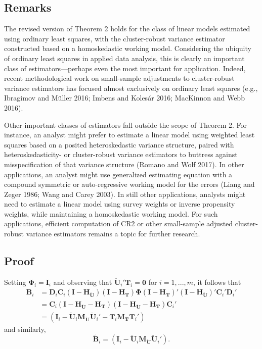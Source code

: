 \documentclass[12pt]{article}
\begin{document}
\hypertarget{remarks}{%
\subsection{Remarks}\label{remarks}}

The revised version of Theorem 2 holds for the class of linear models
estimated using ordinary least squares, with the cluster-robust variance
estimator constructed based on a homoskedastic working model.
Considering the ubiquity of ordinary least squares in applied data
analysis, this is clearly an important class of estimators---perhaps
even the most important for application. Indeed, recent methodological
work on small-sample adjustments to cluster-robust variance estimators
has focused almost exclusively on ordinary least squares (e.g.,
Ibragimov and Müller 2016; Imbens and Kolesár 2016; MacKinnon and Webb
2016).

Other important classes of estimators fall outside the scope of Theorem
2. For instance, an analyst might prefer to estimate a linear model
using weighted least squares based on a posited heteroskedastic variance
structure, paired with heteroskedasticity- or cluster-robust variance
estimators to buttress against misspecification of that variance
structure (Romano and Wolf 2017). In other applications, an analyst
might use generalized estimating equation with a compound symmetric or
auto-regressive working model for the errors (Liang and Zeger 1986; Wang
and Carey 2003). In still other applications, analysts might need to
estimate a linear model using survey weights or inverse propensity
weights, while maintaining a homoskedastic working model. For such
applications, efficient computation of CR2 or other small-sample
adjusted cluster-robust variance estimators remains a topic for further
research.

\hypertarget{proof}{%
\subsection{Proof}\label{proof}}

Setting \(\boldsymbol\Phi_i = \mathbf{I}_i\) and observing that
\(\mathbf{\ddot{U}}_i'\mathbf{T}_i = \mathbf{0}\) for \(i = 1,...,m\),
it follows that \begin{align}
\mathbf{B}_i &= \mathbf{D}_i \mathbf{C}_i \left(\mathbf{I} - \mathbf{H_{\ddot{U}}}\right) \left(\mathbf{I} - \mathbf{H_T}\right) \boldsymbol\Phi \left(\mathbf{I} - \mathbf{H_T}\right)' \left(\mathbf{I} - \mathbf{H_{\ddot{U}}}\right)' \mathbf{C}_i' \mathbf{D}_i' \nonumber \\ 
&= \mathbf{C}_i \left(\mathbf{I} - \mathbf{H_{\ddot{U}}} - \mathbf{H_T}\right) \left(\mathbf{I} - \mathbf{H_{\ddot{U}}} - \mathbf{H_T}\right) \mathbf{C}_i' \nonumber\\ 
\label{eq:B_i}
&= \left(\mathbf{I}_i - \mathbf{\ddot{U}}_i \mathbf{M_{\ddot{U}}}\mathbf{\ddot{U}}_i' - \mathbf{T}_i \mathbf{M_T}\mathbf{T}_i'\right)
\end{align} and similarly, \begin{equation}
\label{eq:Btilde_i}
\tilde{\mathbf{B}}_i = \left(\mathbf{I}_i - \mathbf{\ddot{U}}_i \mathbf{M_{\ddot{U}}}\mathbf{\ddot{U}}_i'\right).
\end{equation}
\end{document}
